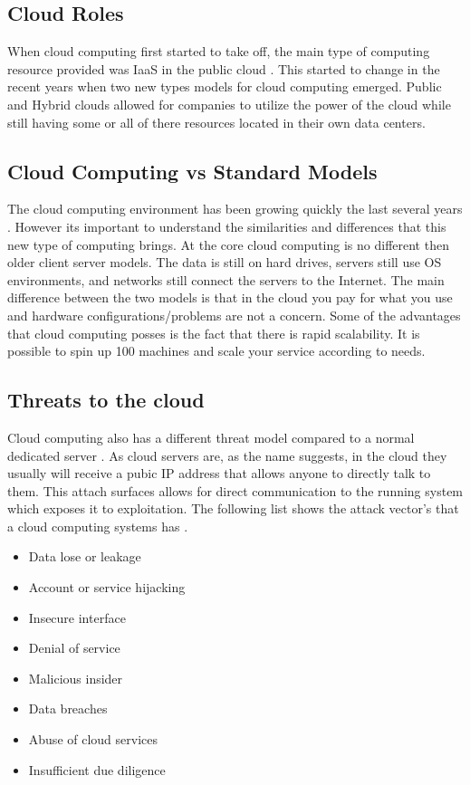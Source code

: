 \documentclass[12pt]{article}
\begin{document}
\subsection{Cloud Roles}
When cloud computing first started to take off, the main type of computing resource provided was IaaS in the public cloud \cite{sourcedigit}. This started to change in the recent years when two new types models for cloud computing emerged. Public and Hybrid clouds allowed for companies to utilize the power of the cloud while still having some or all of there resources located in their own data centers.

\subsection{Cloud Computing vs Standard Models}
The cloud computing environment has been growing quickly the last several years \cite{Vaquero}. However its important to understand the similarities and differences that this new type of computing brings. At the core cloud computing is no different then older client server models. The data is still on hard drives, servers still use OS environments, and networks still connect the servers to the Internet. The main difference between the two models is that in the cloud you pay for what you use and hardware configurations/problems are not a concern. Some of the advantages that cloud computing posses is the fact that there is rapid scalability. It is possible to spin up 100 machines and scale your service according to needs.

\subsection{Threats to the cloud}
Cloud computing also has a different threat model compared to a normal dedicated server \cite{zissis2012addressing, mishra2013cloud, krutz2010cloud}. As cloud servers are, as the name suggests, in the cloud they usually will receive a pubic IP address that allows anyone to directly talk to them. This attach surfaces allows for direct communication to the running system which exposes it to exploitation. The following list shows the attack vector's that a cloud computing systems has \cite{amini2015threat}.

\begin{itemize}
    \item Data lose or leakage
    \item Account or service hijacking
    \item Insecure interface
    \item Denial of service
    \item Malicious insider
    \item Data breaches
    \item Abuse of cloud services
    \item Insufficient due diligence
\end{itemize}
\end{document}
